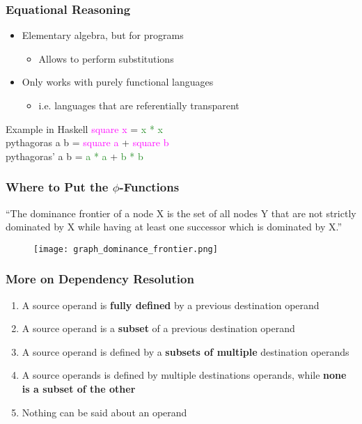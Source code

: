 \documentclass[10pt, xcolor={dvipsnames}]{beamer}
\begin{document}
\begin{frame}
	\frametitle{Equational Reasoning}
	\begin{block}{}
		\begin{itemize}
			\item Elementary algebra, but for programs
			\begin{itemize}
				\item Allows to perform substitutions
			\end{itemize}
			\item Only works with purely functional languages
			\begin{itemize}
				\item i.e. languages that are referentially transparent
			\end{itemize}
		\end{itemize}
	\end{block}
	\vfill
	\begin{block}{Example in Haskell}
		\textcolor{magenta}{square x} = \textcolor{ForestGreen}{x * x}\\
		pythagoras a b = \textcolor{magenta}{square a} + \textcolor{magenta}{square b}\\
		pythagoras' a b = \textcolor{ForestGreen}{a * a} + \textcolor{ForestGreen}{b * b}
	\end{block}
\end{frame}

\begin{frame}
	\frametitle{Where to Put the $\phi$-Functions}
	\begin{exampleblock}{}
		{\large “The \alert{dominance frontier} of a node X is the set of all nodes Y that are not strictly dominated by X while having at least one successor which is dominated by X.”}
	\end{exampleblock}

	\begin{figure}
		\centering
		\texttt{[image: graph\_dominance\_frontier.png]}
	\end{figure}
\end{frame}

\begin{frame}
	\frametitle{More on Dependency Resolution}
	\begin{block}{}
		\begin{enumerate}
			\item A source operand is \textbf{fully defined} by a previous destination operand
			\item A source operand is a \textbf{subset} of a previous destination operand
			\item A source operand is defined by a \textbf{subsets of multiple} destination operands
			\item A source operands is defined by multiple destinations operands, while \textbf{none is a subset of the other}
			\item Nothing can be said about an operand
		\end{enumerate}
	\end{block}
\end{frame}
\end{document}
